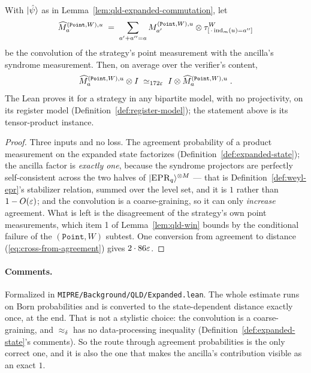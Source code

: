 \begin{lemma}
\label{lem:qld-expanded-consistency}
\leanok
With $|\hat\psi\rangle$ as in Lemma~\ref{lem:qld-expanded-commutation}, let
\begin{equation*}
  \widehat{M}^{(\mathtt{Point},W),u}_a
    \;=\; \sum_{a' + a'' = a} M^{(\mathtt{Point},W),u}_{a'} \otimes \tau^{W}_{[\,\cdot\, \mathrm{ind}_m(u) = a'']}
\end{equation*}
be the convolution of the strategy's point measurement with the ancilla's syndrome measurement.
Then, on average over the verifier's content,
\begin{equation*}
  \widehat{M}^{(\mathtt{Point},W),u}_a \otimes I \;\simeq_{172\varepsilon}\;
    I \otimes \widehat{M}^{(\mathtt{Point},W),u}_a\;.
\end{equation*}
The Lean proves it for a strategy in any bipartite model, with no projectivity, on its register
model (Definition~\ref{def:register-model}); the statement above is its tensor-product instance.
\end{lemma}

\begin{proof}
\leanok
{}
Three inputs and no loss. The agreement probability of a product measurement on the expanded state
factorizes (Definition~\ref{def:expanded-state}); the ancilla factor is \emph{exactly one}, because
the syndrome projectors are perfectly self-consistent across the two halves of
$|\textsc{EPR}_q\rangle^{\otimes M}$ --- that is Definition~\ref{def:weyl-epr}'s stabilizer relation, summed over
the level set, and it is $1$ rather than $1 - O(\varepsilon)$; and the convolution is a coarse-graining, so
it can only \emph{increase} agreement. What is left is the disagreement of the strategy's own point
measurements, which item 1 of Lemma~\ref{lem:qld-win} bounds by the conditional failure of the
$(\mathtt{Point}, W)$ subtest. One conversion from agreement to distance
(\eqref{eq:cross-from-agreement}) gives $2 \cdot 86 \varepsilon$.
\end{proof}

\paragraph{Comments.} Formalized in \texttt{MIPRE/Background/QLD/Expanded.lean}. The whole estimate
runs on Born probabilities and is converted to the state-dependent distance exactly once, at the
end. That is not a stylistic choice: the convolution is a coarse-graining, and
$\approx_\delta$ has no data-processing inequality (Definition~\ref{def:expanded-state}'s comments).
So the route through agreement probabilities is the only correct one, and it is also the one that
makes the ancilla's contribution visible as an exact $1$.

